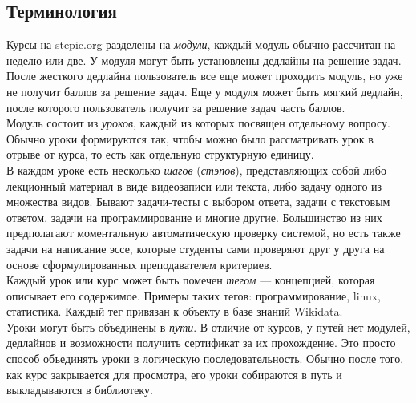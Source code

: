 \documentclass[14pt]{matmex-diploma}
\begin{document}
\subsection{Терминология}
\indent Курсы на stepic.org разделены на \textit{модули}, каждый модуль обычно рассчитан на неделю или две. У модуля могут быть установлены дедлайны на решение задач. После жесткого дедлайна пользователь все еще может проходить модуль, но уже не получит баллов за решение задач. Еще у модуля может быть мягкий дедлайн, после которого пользователь получит за решение задач часть баллов.
\\\indent Модуль состоит из \textit{уроков}, каждый из которых посвящен отдельному вопросу. Обычно уроки формируются так, чтобы можно было рассматривать урок в отрыве от курса, то есть как отдельную структурную единицу.
\\\indent В каждом уроке есть несколько \textit{шагов} (\textit{стэпов}), представляющих собой либо лекционный материал в виде видеозаписи или текста, либо задачу одного из множества видов. Бывают задачи-тесты с выбором ответа, задачи с текстовым ответом, задачи на программирование и многие другие. Большинство из них предполагают моментальную автоматическую проверку системой, но есть также задачи на написание эссе, которые студенты сами проверяют друг у друга на основе сформулированных преподавателем критериев.
\\\indent Каждый урок или курс может быть помечен \textit{тегом} --- концепцией, которая описывает его содержимое. Примеры таких тегов: программирование, linux, статистика. Каждый тег привязан к объекту в базе знаний Wikidata.
\\\indent Уроки могут быть объединены в \textit{пути}. В отличие от курсов, у путей нет модулей, дедлайнов и возможности получить сертификат за их прохождение. Это просто способ объединять уроки в логическую последовательность. Обычно после того, как курс закрывается для просмотра, его уроки собираются в путь и выкладываются в библиотеку.
\end{document}
